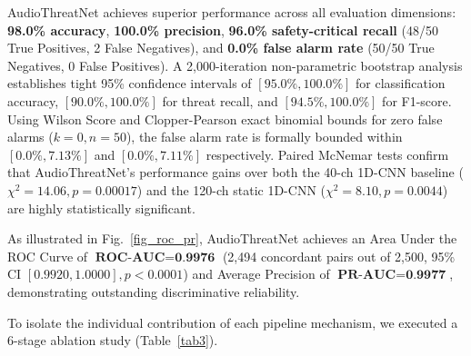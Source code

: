 \documentclass[conference]{IEEEtran}
\begin{document}
AudioThreatNet achieves superior performance across all evaluation dimensions: \textbf{98.0\% accuracy}, \textbf{100.0\% precision}, \textbf{96.0\% safety-critical recall} (48/50 True Positives, 2 False Negatives), and \textbf{0.0\% false alarm rate} (50/50 True Negatives, 0 False Positives). A 2,000-iteration non-parametric bootstrap analysis establishes tight 95\% confidence intervals of $[95.0\%, 100.0\%]$ for classification accuracy, $[90.0\%, 100.0\%]$ for threat recall, and $[94.5\%, 100.0\%]$ for F1-score. Using Wilson Score \cite{b24} and Clopper-Pearson exact binomial bounds for zero false alarms ($k=0, n=50$), the false alarm rate is formally bounded within $[0.0\%, 7.13\%]$ and $[0.0\%, 7.11\%]$ respectively. Paired McNemar tests confirm that AudioThreatNet's performance gains over both the 40-ch 1D-CNN baseline ($\chi^2 = 14.06, p = 0.00017$) and the 120-ch static 1D-CNN ($\chi^2 = 8.10, p = 0.0044$) are highly statistically significant.

As illustrated in Fig.~\ref{fig_roc_pr}, AudioThreatNet achieves an Area Under the ROC Curve of $\textbf{ROC-AUC} = \textbf{0.9976}$ (2,494 concordant pairs out of 2,500, 95\% CI $[0.9920, 1.0000], p < 0.0001$) and Average Precision of $\textbf{PR-AUC} = \textbf{0.9977}$, demonstrating outstanding discriminative reliability.

To isolate the individual contribution of each pipeline mechanism, we executed a 6-stage ablation study (Table~\ref{tab3}).
\end{document}
